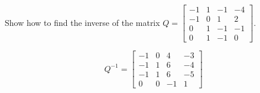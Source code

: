 
\begin{exerciseStatement}


Show how to find the inverse of the matrix \(Q= \left[\begin{array}{cccc}
-1 & 1 & -1 & -4 \\
-1 & 0 & 1 & 2 \\
0 & 1 & -1 & -1 \\
0 & 1 & -1 & 0
\end{array}\right] \).


\end{exerciseStatement}
    
\begin{exerciseAnswer} 
\[Q^{-1}= \left[\begin{array}{cccc}
-1 & 0 & 4 & -3 \\
-1 & 1 & 6 & -4 \\
-1 & 1 & 6 & -5 \\
0 & 0 & -1 & 1
\end{array}\right] \]
\end{exerciseAnswer}
    
